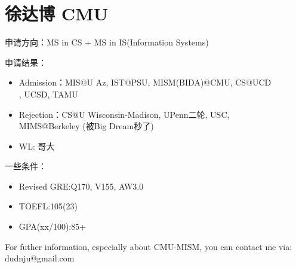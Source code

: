 \section{徐达博 CMU}
申请方向：MS in CS + MS in IS(Information Systems)\par
申请结果：
\begin{itemize}
\item Admission：MIS@U Az, IST@PSU, MISM(BIDA)@CMU, CS@UCD\\, UCSD, TAMU
\item Rejection：CS@U Wisconsin-Madison, UPenn二轮, USC, \\MIMS@Berkeley (被Big Dream秒了)
\item WL: 哥大
\end{itemize}
\par
一些条件：
\begin{itemize}
\item Revised GRE:Q170, V155, AW3.0
\item TOEFL:105(23)
\item GPA(xx/100):85+
\end{itemize}
\par
For futher information, especially about CMU-MISM, you can contact me via: dudnju@gmail.com

